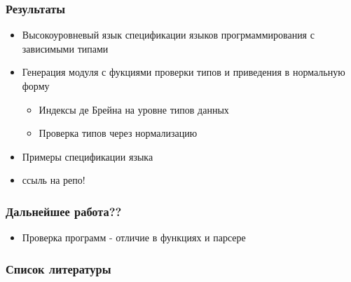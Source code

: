 \documentclass[14pt]{beamer}
\begin{document}
\begin{frame}
\frametitle{Результаты}
\begin{itemize}
  \item Высокоуровневый язык спецификации языков прогрмаммирования с зависимыми типами
  \item Генерация модуля с фукциями проверки типов и приведения в нормальную форму
  \begin{itemize}
    \item Индексы де Брейна на уровне типов данных
    \item Проверка типов через нормализацию
  \end{itemize}
  \item Примеры спецификации языка
  \item ссыль на репо!
\end{itemize}
\end{frame}

\begin{frame}
\frametitle{Дальнейшее работа??}
\begin{itemize}
  \item Проверка программ - отличие в функциях и парсере
\end{itemize}
\end{frame}

\begin{frame} %
\frametitle{Список литературы}
\printbibliography
\end{frame}
\end{document}
